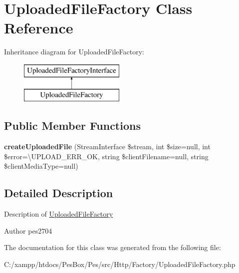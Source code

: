 \hypertarget{class_pes_1_1_http_1_1_factory_1_1_uploaded_file_factory}{}\section{Uploaded\+File\+Factory Class Reference}
\label{class_pes_1_1_http_1_1_factory_1_1_uploaded_file_factory}
Inheritance diagram for Uploaded\+File\+Factory\+:\begin{figure}[H]
\begin{center}
\leavevmode
\includegraphics[height=2.000000cm]{class_pes_1_1_http_1_1_factory_1_1_uploaded_file_factory}
\end{center}
\end{figure}
\subsection*{Public Member Functions}
\begin{DoxyCompactItemize}
\item 
\mbox{\label{class_pes_1_1_http_1_1_factory_1_1_uploaded_file_factory_acbcc538b83b22c57ed28618fdef759fe}} 
{\bfseries create\+Uploaded\+File} (Stream\+Interface \$stream, int \$size=null, int \$error=\textbackslash{}U\+P\+L\+O\+A\+D\+\_\+\+E\+R\+R\+\_\+\+OK, string \$client\+Filename=null, string \$client\+Media\+Type=null)
\end{DoxyCompactItemize}


\subsection{Detailed Description}
Description of \mbox{\hyperlink{class_pes_1_1_http_1_1_factory_1_1_uploaded_file_factory}{Uploaded\+File\+Factory}}

\begin{DoxyAuthor}{Author}
pes2704 
\end{DoxyAuthor}


The documentation for this class was generated from the following file\+:\begin{DoxyCompactItemize}
\item 
C\+:/xampp/htdocs/\+Pes\+Box/\+Pes/src/\+Http/\+Factory/Uploaded\+File\+Factory.\+php\end{DoxyCompactItemize}
